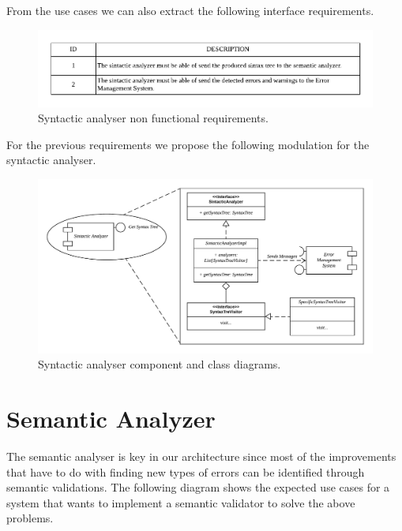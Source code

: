 From the use cases we can also extract the following interface requirements.

\begin{figure}[h!]
    \includegraphics[width=\textwidth]{images/sin-reqnf.pdf}
    \centering
    \caption[Syntactic analyser non functional requirements]{Syntactic analyser non functional requirements.}
    \label{fig:sin-reqnf}
\end{figure}

For the previous requirements we propose the following modulation for the syntactic analyser.

\begin{figure}[h!]
    \includegraphics[width=\textwidth]{images/sin-diagram.pdf}
    \centering
    \caption[Syntactic analyser component and class diagrams]{Syntactic analyser component and class diagrams.}
    \label{fig:sin-diag}
\end{figure}

\section{Semantic Analyzer}
The semantic analyser is key in our architecture since most of the improvements
that have to do with finding new types of errors can be identified through semantic
validations. The following diagram shows the expected use cases for a system that
wants to implement a semantic validator to solve the above problems.

